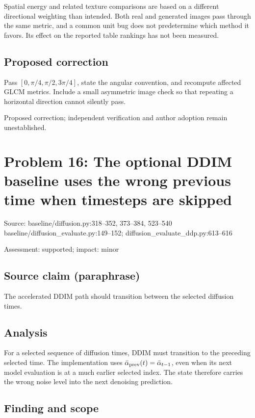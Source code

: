 \documentclass[11pt]{article}
\begin{document}
Spatial energy and related texture comparisons are based on a different directional weighting than intended. Both real and generated images pass through the same metric, and a common unit bug does not predetermine which method it favors. Its effect on the reported table rankings has not been measured.

\subsection*{Proposed correction}

Pass \([0,\pi/4,\pi/2,3\pi/4]\), state the angular convention, and recompute affected GLCM metrics. Include a small asymmetric image check so that repeating a horizontal direction cannot silently pass.

Proposed correction; independent verification and author adoption remain unestablished.

\section*{Problem 16: The optional DDIM baseline uses the wrong previous time when timesteps are skipped}

Source: baseline/diffusion.py:318–352, 373–384, 523–540 baseline/diffusion\_evaluate.py:149–152; diffusion\_evaluate\_ddp.py:613–616

Assessment: supported; impact: minor

\subsection*{Source claim (paraphrase)}

The accelerated DDIM path should transition between the selected diffusion times.

\subsection*{Analysis}

For a selected sequence of diffusion times, DDIM must transition to the preceding selected time. The implementation uses \(\bar\alpha_{\rm prev}(t)=\bar\alpha_{t-1}\), even when its next model evaluation is at a much earlier selected index. The state therefore carries the wrong noise level into the next denoising prediction.

\subsection*{Finding and scope}
\end{document}
